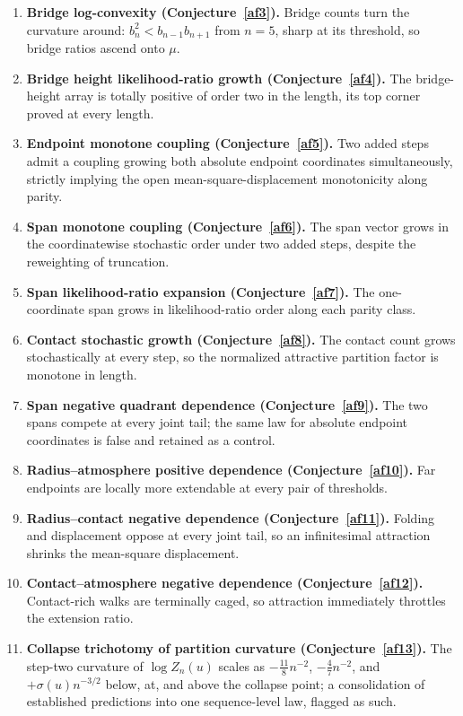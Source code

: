 \documentclass[11pt]{article}
\theoremstyle{definition}
\begin{document}
\begin{enumerate}
\item \textbf{Bridge log-convexity (Conjecture~\ref{af3}).}  Bridge counts turn the curvature around: $b_n^2<b_{n-1}b_{n+1}$ from $n=5$, sharp at its threshold, so bridge ratios ascend onto $\mu$.
\item \textbf{Bridge height likelihood-ratio growth (Conjecture~\ref{af4}).}  The bridge-height array is totally positive of order two in the length, its top corner proved at every length.
\item \textbf{Endpoint monotone coupling (Conjecture~\ref{af5}).}  Two added steps admit a coupling growing both absolute endpoint coordinates simultaneously, strictly implying the open mean-square-displacement monotonicity along parity.
\item \textbf{Span monotone coupling (Conjecture~\ref{af6}).}  The span vector grows in the coordinatewise stochastic order under two added steps, despite the reweighting of truncation.
\item \textbf{Span likelihood-ratio expansion (Conjecture~\ref{af7}).}  The one-coordinate span grows in likelihood-ratio order along each parity class.
\item \textbf{Contact stochastic growth (Conjecture~\ref{af8}).}  The contact count grows stochastically at every step, so the normalized attractive partition factor is monotone in length.
\item \textbf{Span negative quadrant dependence (Conjecture~\ref{af9}).}  The two spans compete at every joint tail; the same law for absolute endpoint coordinates is false and retained as a control.
\item \textbf{Radius--atmosphere positive dependence (Conjecture~\ref{af10}).}  Far endpoints are locally more extendable at every pair of thresholds.
\item \textbf{Radius--contact negative dependence (Conjecture~\ref{af11}).}  Folding and displacement oppose at every joint tail, so an infinitesimal attraction shrinks the mean-square displacement.
\item \textbf{Contact--atmosphere negative dependence (Conjecture~\ref{af12}).}  Contact-rich walks are terminally caged, so attraction immediately throttles the extension ratio.
\item \textbf{Collapse trichotomy of partition curvature (Conjecture~\ref{af13}).}  The step-two curvature of $\log Z_n(u)$ scales as $-\tfrac{11}8n^{-2}$, $-\tfrac47n^{-2}$, and $+\sigma(u)n^{-3/2}$ below, at, and above the collapse point; a consolidation of established predictions into one sequence-level law, flagged as such.

\end{enumerate}
\end{document}
